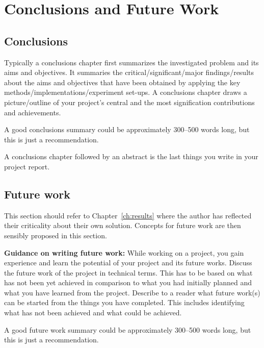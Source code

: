 \chapter{Conclusions and Future Work}
\label{ch:con}
\section{Conclusions}
Typically a conclusions chapter first summarizes the investigated problem and its aims and objectives. It summaries the critical/significant/major findings/results about the aims and objectives that have been obtained by applying the key methods/implementations/experiment set-ups. A conclusions chapter draws a picture/outline of your project's central and the most signification contributions and achievements. 

A good conclusions summary could be approximately 300--500 words long, but this is just a recommendation.

A conclusions chapter followed by an abstract is the last things you write in your project report.

\section{Future work}
This section should refer to Chapter~\ref{ch:results} where the author has reflected their criticality about their own solution. Concepts for future work are then sensibly proposed in this section.

\textbf{Guidance on writing future work:} While working on a project, you gain experience and learn the potential of your project and its future works. Discuss the future work of the project in technical terms. This has to be based on what has not been yet achieved in comparison to what you had initially planned and what you have learned from the project. Describe to a reader what future work(s) can be started from the things you have completed. This includes identifying what has not been achieved and what could be achieved. 



A good future work summary could be approximately 300--500 words long, but this is just a recommendation.
